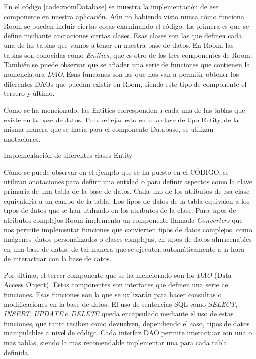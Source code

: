 En el código \ref{code:roomDatabase} se muestra la  implementación de ese componente en nuestra aplicación. Aún no habiendo visto nunca cómo funciona Room se pueden incluir ciertas cosas examinando el código. La primera es que se define mediante anotaciones ciertas clases. Esas clases son las que definen cada una de las tablas que vamos a tener en nuestra base de datos. En Room, las tablas son conocidas como \textit{Entities}, que es otro de los tres componentes de Room. También se puede observar que se añaden una serie de funciones que contienen la nomenclatura \textit{DAO}. Esas funciones son las que nos van a permitir obtener los diferentes DAOs que puedan existir en Room, siendo este tipo de componente el tercero y último.

Como se ha mencionado, las Entities corresponden a cada una de las tablas que existe en la base de datos. Para reflejar esto en una clase de tipo Entity, de la misma manera que se hacía para el componente Database, se utilizan anotaciones.

\begin{listing}[H]
	\caption{Implementación de diferentes clases Entity}
	
	\label{code:roomEntities}
\end{listing}

Cómo se puede observar en el ejemplo que se ha puesto en el CÓDIGO, se utilizan anotaciones para definir una entidad o para definir aspectos como la clave primaria de una tabla de la base de datos. Cada uno de los atributos de esa clase equivaldría a un campo de la tabla. Los tipos de datos de la tabla equivalen a los tipos de datos que se han utilizado en los atributos de la clase. Para tipos de atributos complejos Room implementa un componente llamado \textit{Converters} que nos permite implementar funciones que convierten tipos de datos complejos, como imágenes, datos personalizados o clases complejas, en tipos de datos almacenables en una base de datos, de tal manera que se ejecuten automáticamente a la hora de interactuar con la base de datos.

Por último, el tercer componente que se ha mencionado son los \textit{DAO} (Data Access Object). Estos componentes son interfaces que definen una serie de funciones. Esas funciones son la que se utilizarán para hacer consultas o modificaciones en la base de datos. El uso de sentencias SQL como \textit{SELECT}, \textit{INSERT}, \textit{UPDATE} o \textit{DELETE} queda encapsulado mediante el uso de estas funciones, que tanto reciben como devuelven, dependiendo el caso, tipos de datos manipulables a nivel de código. Cada interfaz DAO permite interactuar con una o mas tablas, siendo lo mas recomendable implementar una para cada tabla definida.

